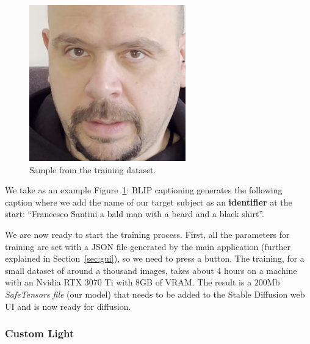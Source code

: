 \documentclass[sn-mathphys,Numbered]{sn-jnl}
\theoremstyle{thmstyleone}%
\theoremstyle{thmstyletwo}%
\theoremstyle{thmstylethree}%
\begin{document}
\begin{figure}[t]
	\centering
	\includegraphics[scale=0.3, keepaspectratio]{img/project_img/santini-training.png}
	\caption{Sample from the training dataset.}
	\label{fig:santini-training}
\end{figure}


We take as an example Figure~\ref{fig:santini-training}: BLIP captioning generates the following caption where we add the name of our target subject as an \textbf{identifier} at the start: ``Francesco Santini a bald man with a beard and a black shirt''.

We are now ready to start the training process.  First, all the parameters for training are set with a JSON file generated by the main application (further explained in Section~\ref{sec:gui}), so we need to press a button. The training, for a small dataset of around a thousand images, 
takes about $4$ hours on a machine with an Nvidia RTX 3070 Ti with $8$GB of VRAM.  The result is a $200$Mb \emph{SafeTensors file} (our model) that needs to be added to the Stable Diffusion web UI and is now ready for diffusion.

\subsubsection{Custom Light}
\end{document}
